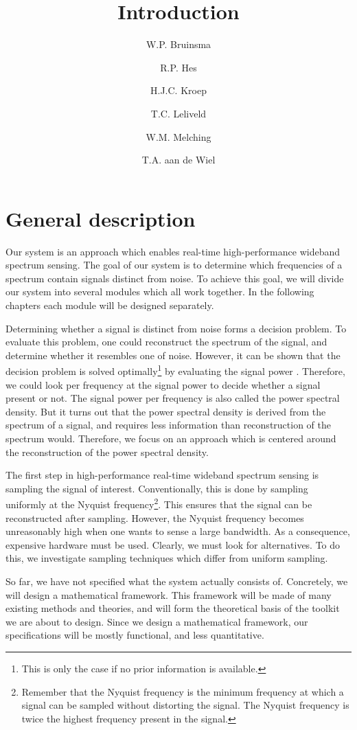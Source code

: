 \documentclass[a4paper, openany, oneside]{memoir}
\title{Introduction}
\author{W.P. Bruinsma \and R.P. Hes \and H.J.C. Kroep \and T.C. Leliveld \and W.M. Melching \and T.A. aan de Wiel}
\begin{document}
\section{General description}
Our system is an approach which enables real-time high-performance wideband spectrum sensing. The goal of our system is to determine which frequencies of a spectrum contain signals distinct from noise. To achieve this goal, we will divide our system into several modules which all work together. In the following chapters each module will be designed separately.

Determining whether a signal is distinct from noise forms a decision problem. To evaluate this problem, one could reconstruct the spectrum of the signal, and determine whether it resembles one of noise. However, it can be shown that the decision problem is solved optimally\footnote{This is only the case if no prior information is available.} by evaluating the signal power \cite{axell2012spectrum}. Therefore, we could look per frequency at the signal power to decide whether a signal present or not. The signal power per frequency is also called the power spectral density. But it turns out that the power spectral density is derived from the spectrum of a signal, and requires less information than reconstruction of the spectrum would. Therefore, we focus on an approach which is centered around the reconstruction of the power spectral density.

The first step in high-performance real-time wideband spectrum sensing is sampling the signal of interest. Conventionally, this is done by sampling uniformly at the Nyquist frequency\footnote{Remember that the Nyquist frequency is the minimum frequency at which a signal can be sampled without distorting the signal. The Nyquist frequency is twice the highest frequency present in the signal.}. This ensures that the signal can be reconstructed after sampling. However, the Nyquist frequency becomes unreasonably high when one wants to sense a large bandwidth. As a consequence, expensive hardware must be used. Clearly, we must look for alternatives. To do this, we investigate sampling techniques which differ from uniform sampling.

So far, we have not specified what the system actually consists of. Concretely, we will design a mathematical framework. This framework will be made of many existing methods and theories, and will form the theoretical basis of the toolkit we are about to design. Since we design a mathematical framework, our specifications will be mostly functional, and less quantitative. 
\end{document}
